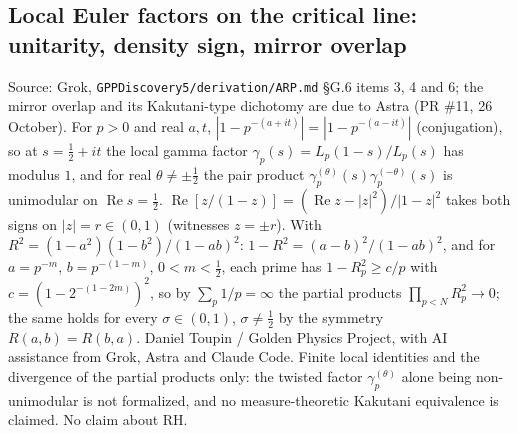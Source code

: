 \documentclass{report}
\theoremstyle{definition}
\begin{document}
\begin{itemize}
\begin{itemize}
\section{Local Euler factors on the critical line: unitarity, density sign, mirror overlap}
Source: Grok, \texttt{GPPDiscovery5/derivation/ARP.md} \S G.6 items 3, 4 and 6; the mirror overlap and its Kakutani-type dichotomy are due to Astra (PR \#11, 26 October).
For $p>0$ and real $a,t$, $|1-p^{-(a+it)}|=|1-p^{-(a-it)}|$ (conjugation), so at $s=\tfrac12+it$ the local gamma factor $\gamma_p(s)=L_p(1-s)/L_p(s)$ has modulus $1$,
and for real $\theta\ne\pm\tfrac12$ the pair product $\gamma_p^{(\theta)}(s)\gamma_p^{(-\theta)}(s)$ is unimodular on $\operatorname{Re}s=\tfrac12$.
$\operatorname{Re}[z/(1-z)]=(\operatorname{Re}z-|z|^2)/|1-z|^2$ takes both signs on $|z|=r\in(0,1)$ (witnesses $z=\pm r$).
With $R^2=(1-a^2)(1-b^2)/(1-ab)^2$: $1-R^2=(a-b)^2/(1-ab)^2$, and for $a=p^{-m}$, $b=p^{-(1-m)}$, $0<m<\tfrac12$, each prime has $1-R_p^2\ge c/p$ with $c=(1-2^{-(1-2m)})^2$,
so by $\sum_p1/p=\infty$ the partial products $\prod_{p<N}R_p^2\to0$; the same holds for every $\sigma\in(0,1)$, $\sigma\ne\tfrac12$ by the symmetry $R(a,b)=R(b,a)$.
Daniel Toupin / Golden Physics Project, with AI assistance from Grok, Astra and Claude Code. Finite local identities and the divergence of the partial products only: the twisted factor
$\gamma_p^{(\theta)}$ alone being non-unimodular is not formalized, and no measure-theoretic Kakutani equivalence is claimed. No claim about RH.


\end{itemize}
\end{itemize}
\end{document}
